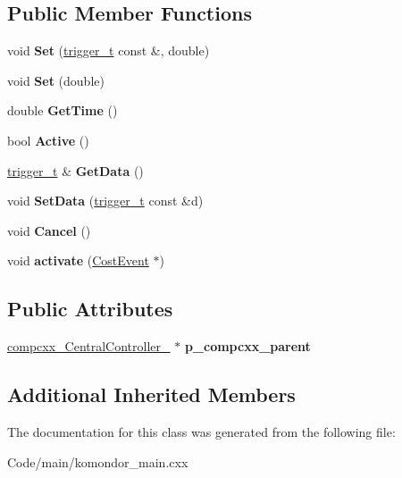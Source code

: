 \subsection*{Public Member Functions}
\begin{DoxyCompactItemize}
\item 
\mbox{\label{classcompcxx__Timer__22_ac29a6402c29603b206d7a05f880ce837}} 
void {\bfseries Set} (\hyperlink{classtrigger__t}{trigger\+\_\+t} const \&, double)
\item 
\mbox{\label{classcompcxx__Timer__22_aa9237014c12d6e581aeedbe7c2c6718e}} 
void {\bfseries Set} (double)
\item 
\mbox{\label{classcompcxx__Timer__22_a3d5db413931a94f7f3e1657fe6db4d58}} 
double {\bfseries Get\+Time} ()
\item 
\mbox{\label{classcompcxx__Timer__22_afd87b916902eb89dbd483ed0bc2c6c95}} 
bool {\bfseries Active} ()
\item 
\mbox{\label{classcompcxx__Timer__22_a43737285477d126eca775306bbd6283c}} 
\hyperlink{classtrigger__t}{trigger\+\_\+t} \& {\bfseries Get\+Data} ()
\item 
\mbox{\label{classcompcxx__Timer__22_a604bcc01ec601c6f7163a23c91582407}} 
void {\bfseries Set\+Data} (\hyperlink{classtrigger__t}{trigger\+\_\+t} const \&d)
\item 
\mbox{\label{classcompcxx__Timer__22_aac4833497950f060a68b82a0115eee95}} 
void {\bfseries Cancel} ()
\item 
\mbox{\label{classcompcxx__Timer__22_a22700ca654795698a78f94708d1c422f}} 
void {\bfseries activate} (\hyperlink{structCostEvent}{Cost\+Event} $\ast$)
\end{DoxyCompactItemize}
\subsection*{Public Attributes}
\begin{DoxyCompactItemize}
\item 
\mbox{\label{classcompcxx__Timer__22_a77f891a2a289ceac4012c8864abcb675}} 
\hyperlink{classcompcxx__CentralController__26}{compcxx\+\_\+\+Central\+Controller\+\_} $\ast$ {\bfseries p\+\_\+compcxx\+\_\+parent}
\end{DoxyCompactItemize}
\subsection*{Additional Inherited Members}


The documentation for this class was generated from the following file\+:\begin{DoxyCompactItemize}
\item 
Code/main/komondor\+\_\+main.\+cxx\end{DoxyCompactItemize}
